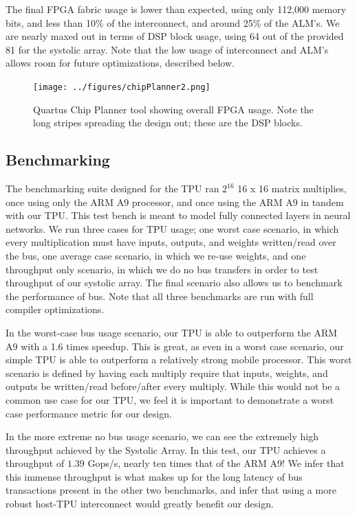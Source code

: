 \documentclass[11pt, conference, onecolumn]{IEEEtran}
\begin{document}
        The final FPGA fabric usage is lower than expected, using only 112,000 memory bits,
        and less than 10\% of the interconnect, and around 25\% of the ALM's. We are
        nearly maxed out in terms of DSP block usage, using 64 out of the provided 81 for
        the systolic array. Note that the low usage of interconnect and ALM's allows room
        for future optimizations, described below.

        \begin{figure}[htbp]
            \centering
            \texttt{[image: ../figures/chipPlanner2.png]}
            \caption{Quartus Chip Planner tool showing overall FPGA usage. Note the
                long stripes spreading the design out; these are the DSP blocks.}
        \end{figure}

    \subsection{Benchmarking}
        The benchmarking suite designed for the TPU ran $2^{16}$ 16 x 16 matrix multiplies,
        once using only the ARM A9 processor, and once using the ARM A9 in tandem with
        our TPU. This test bench is meant to model fully connected layers in neural
        networks. We run three cases for TPU usage; one worst case scenario, in which every
        multiplication must have inputs, outputs, and weights written/read over the bus,
        one average case scenario, in which we re-use weights, and one throughput only
        scenario, in which we do no bus transfers in order to test throughput of our
        systolic array. The final scenario also allows us to benchmark the performance of
        bus. Note that all three benchmarks are run with full compiler optimizations.

        In the worst-case bus usage scenario, our TPU is able to outperform the ARM A9
        with a 1.6 times speedup. This is great, as even in a worst case scenario, our
        simple TPU is able to outperform a relatively strong mobile processor. This worst
        scenario is defined by having each multiply require that inputs, weights, and
        outputs be written/read before/after every multiply. While this would not be a
        common use case for our TPU, we feel it is important to demonstrate a worst case
        performance metric for our design.

        In the more extreme no bus usage scenario, we can see the extremely high throughput
        achieved by the Systolic Array. In this test, our TPU achieves a throughput of
        $1.39$ Gops/s, nearly ten times that of the ARM A9! We infer that this
        immense throughput is what makes up for the long latency of bus transactions
        present in the other two benchmarks, and infer that using a more robust
        host-TPU interconnect would greatly benefit our design.
\end{document}
